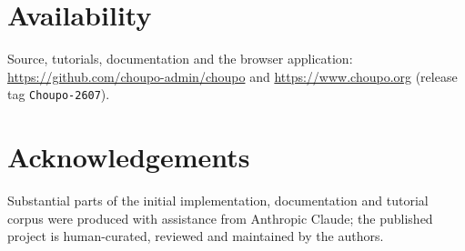 \documentclass[11pt,a4paper]{article}
\newcommand{\code}[1]{\texttt{#1}}
\begin{document}
\section*{Availability}

Source, tutorials, documentation and the browser application:
\url{https://github.com/choupo-admin/choupo} and
\url{https://www.choupo.org} (release tag \code{Choupo-2607}).

\section*{Acknowledgements}

Substantial parts of the initial implementation, documentation and
tutorial corpus were produced with assistance from Anthropic Claude; the
published project is human-curated, reviewed and maintained by the
authors.



\end{document}
